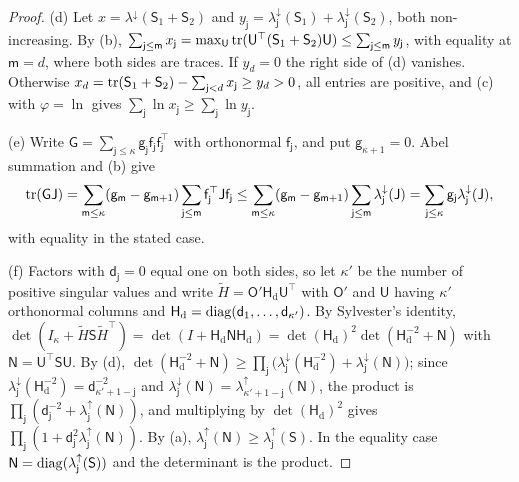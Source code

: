 \begin{proof}
(d) Let $x=\lambda^\downarrow(\mathsf S_1+\mathsf S_2)$ and $y_{\mathsf j}=\lambda^\downarrow_{\mathsf j}(\mathsf S_1)+\lambda^\downarrow_{\mathsf j}(\mathsf S_2)$, both non-increasing. By (b), $\sum_{\mathsf j\le\mathsf m}x_{\mathsf j}=\max_{\mathsf U}\operatorname{tr}(\mathsf U^\top(\mathsf S_1+\mathsf S_2)\mathsf U)\le\sum_{\mathsf j\le\mathsf m}y_{\mathsf j}$, with equality at $\mathsf m=d$, where both sides are traces. If $y_d=0$ the right side of (d) vanishes. Otherwise $x_d=\operatorname{tr}(\mathsf S_1+\mathsf S_2)-\sum_{\mathsf j<d}x_{\mathsf j}\ge y_d>0$, all entries are positive, and (c) with $\varphi=\ln$ gives $\sum_{\mathsf j}\ln x_{\mathsf j}\ge\sum_{\mathsf j}\ln y_{\mathsf j}$.

(e) Write $\mathsf G=\sum_{\mathsf j\le\kappa}\mathsf g_{\mathsf j}\mathsf f_{\mathsf j}\mathsf f_{\mathsf j}^\top$ with orthonormal $\mathsf f_{\mathsf j}$, and put $\mathsf g_{\kappa+1}=0$. Abel summation and (b) give
\[
\operatorname{tr}(\mathsf G\mathsf J)=\sum_{\mathsf m\le\kappa}(\mathsf g_{\mathsf m}-\mathsf g_{\mathsf m+1})\sum_{\mathsf j\le\mathsf m}\mathsf f_{\mathsf j}^\top\mathsf J\mathsf f_{\mathsf j}\le\sum_{\mathsf m\le\kappa}(\mathsf g_{\mathsf m}-\mathsf g_{\mathsf m+1})\sum_{\mathsf j\le\mathsf m}\lambda^\downarrow_{\mathsf j}(\mathsf J)=\sum_{\mathsf j\le\kappa}\mathsf g_{\mathsf j}\lambda^\downarrow_{\mathsf j}(\mathsf J),
\]
with equality in the stated case.

(f) Factors with $\mathsf d_{\mathsf j}=0$ equal one on both sides, so let $\kappa'$ be the number of positive singular values and write $\tilde H=\mathsf O'\mathsf H_{\mathrm d}\mathsf U^\top$ with $\mathsf O'$ and $\mathsf U$ having $\kappa'$ orthonormal columns and $\mathsf H_{\mathrm d}=\operatorname{diag}(\mathsf d_1,\dots,\mathsf d_{\kappa'})$. By Sylvester's identity, $\det(I_\kappa+\tilde H\mathsf S\tilde H^\top)=\det(I+\mathsf H_{\mathrm d}\mathsf N\mathsf H_{\mathrm d})=\det(\mathsf H_{\mathrm d})^2\det(\mathsf H_{\mathrm d}^{-2}+\mathsf N)$ with $\mathsf N=\mathsf U^\top\mathsf S\mathsf U$. By (d), $\det(\mathsf H_{\mathrm d}^{-2}+\mathsf N)\ge\prod_{\mathsf j}\bigl(\lambda^\downarrow_{\mathsf j}(\mathsf H_{\mathrm d}^{-2})+\lambda^\downarrow_{\mathsf j}(\mathsf N)\bigr)$; since $\lambda^\downarrow_{\mathsf j}(\mathsf H_{\mathrm d}^{-2})=\mathsf d_{\kappa'+1-\mathsf j}^{-2}$ and $\lambda^\downarrow_{\mathsf j}(\mathsf N)=\lambda^\uparrow_{\kappa'+1-\mathsf j}(\mathsf N)$, the product is $\prod_{\mathsf j}(\mathsf d_{\mathsf j}^{-2}+\lambda^\uparrow_{\mathsf j}(\mathsf N))$, and multiplying by $\det(\mathsf H_{\mathrm d})^2$ gives $\prod_{\mathsf j}(1+\mathsf d_{\mathsf j}^2\lambda^\uparrow_{\mathsf j}(\mathsf N))$. By (a), $\lambda^\uparrow_{\mathsf j}(\mathsf N)\ge\lambda^\uparrow_{\mathsf j}(\mathsf S)$. In the equality case $\mathsf N=\operatorname{diag}(\lambda^\uparrow_{\mathsf j}(\mathsf S))$ and the determinant is the product.
\end{proof}

